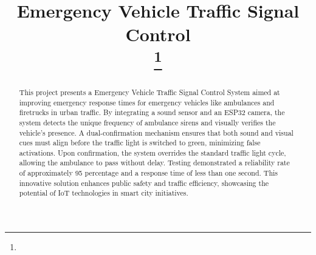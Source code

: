 \documentclass[conference]{IEEEtran}
\begin{document}
\title{Emergency Vehicle Traffic Signal Control\\
{\footnotesize \textsuperscript{}}
\thanks{}
}

\author{
\and
{}
\and
{}
\and
\IEEEauthorblockN{\textsuperscript{} }
\IEEEauthorblockA{\textit{} \\
\textit{}\\
\\}
\and
\IEEEauthorblockN{\textsuperscript{} }
\IEEEauthorblockA{\textit{} \\
\textit{}\\
\\
}
\and
\IEEEauthorblockN{\textsuperscript{} }
\IEEEauthorblockA{\textit{} \\
\textit{}\\
\\
}
}

\maketitle

\begin{abstract}
This project presents a Emergency Vehicle Traffic Signal Control System aimed at improving emergency response times for emergency vehicles like ambulances and firetrucks in urban traffic. By integrating a sound sensor and an ESP32 camera, the system detects the unique frequency of ambulance sirens and visually verifies the vehicle's presence. A dual-confirmation mechanism ensures that both sound and visual cues must align before the traffic light is switched to green, minimizing false activations. Upon confirmation, the system overrides the standard traffic light cycle, allowing the ambulance to pass without delay. Testing demonstrated a reliability rate of approximately 95 percentage and a response time of less than one second. This innovative solution enhances public safety and traffic efficiency, showcasing the potential of IoT technologies in smart city initiatives.
\end{abstract}
\end{document}
